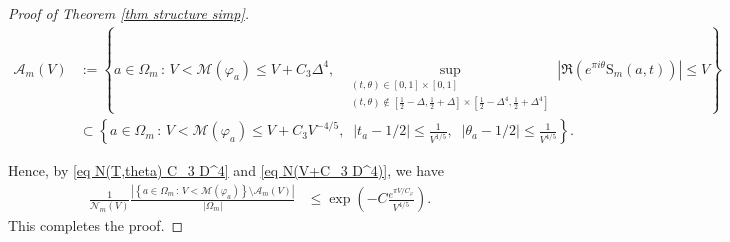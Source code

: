 \documentclass[10pt,a4paper]{amsart}
\def\B{\mathrm{S}}
\def\M{\mathcal{M}}
\def\Mp{C_\varphi}
\def\Ncal{\mathcal{N}}
\begin{document}
\begin{proof}[Proof of Theorem \ref{thm structure simp}]
\begin{align*}
\mathcal{A}_m(V)&:= \left\{
a \in \Omega_m \, :\,  
V < \M(\varphi_a)\leq V + C_3\Delta^4, \;\;
\sup_{\substack{(t,\theta) \in 
[0,1]\times [0,1] 
\\
(t,\theta) \not\in 
\left[\frac{1}{2}-\Delta,\frac{1}{2}+\Delta\right]\times \left[\frac{1}{2}-\Delta^4,\frac{1}{2}+\Delta^4\right] }}
\left|\Re\left(e^{\pi i\theta}\B_m(a,t)\right)
\right|\leq V
\right\}\\
&\subset \left\{
a \in \Omega_m \, :\,  
V < \M(\varphi_a)\leq V + C_3 V^{-4/5}, \;\;
| t_a - 1/2|\leq \frac{1}{V^{1/5}}, \;\; | \theta_a - 1/2|\leq \frac{1}{V^{4/5}}
\right\}.
\end{align*}

Hence, by \eqref{eq N(T,theta) C_3 D^4}
and \eqref{eq N(V+C_3 D^4)}, we have
\begin{align*}
\frac{1}{\Ncal_m(V)}\frac{| \left\{
a \in \Omega_m \, :\,  
V < \M(\varphi_a)\right\} 
\setminus \mathcal{A}_m(V)| }{| \Omega_m |}
&\leq  
\exp\left(- C\frac{e^{\pi V/\Mp}}{V^{4/5}}\right) .
\end{align*}
This completes the proof.
\end{proof}
\end{document}
